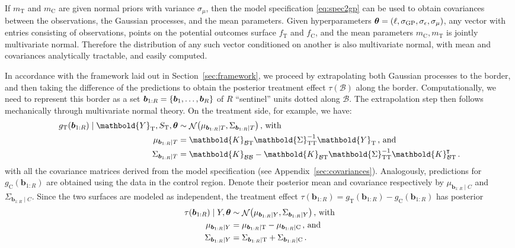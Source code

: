 \documentclass[letter,12pt]{article}
\DeclarePairedDelimiter{\parenthesis}{\lparen}{\rparen}
\DeclarePairedDelimiter{\curlybracket}{\lbrace}{\rbrace}
\newcommand{\del}[1]{\parenthesis*{#1}}
\newcommand{\cbr}[1]{\curlybracket*{#1}}
\DeclareMathOperator{\normal}{\mathcal{N}}
\newcommand*{\trans}{^{\mkern-1.5mu\intercal}}
\newcommand{\treat}{\mathrm{T}}
\newcommand{\ctrol}{\mathrm{C}}
\newcommand{\sigmaf}{\sigma_{\mathrm{GP}}}
\newcommand{\sigman}{\sigma_{\epsilon}}
\newcommand{\sigmamu}{\sigma_{\mu}}
\newcommand{\Yvec}{\mathbold{Y}}
\newcommand{\yt}{\Yvec_{\treat}}
\newcommand{\border}{\mathcal{B}}
\newcommand{\sentinel}{\bm{b}}
\newcommand{\numsent}{R}
\newcommand{\sentinels}{\sentinel_{1:\numsent}}
\newcommand{\sentinelset}{\cbr{\sentinel_1,\ldots,\sentinel_\numsent}}
\newcommand{\eqlabel}[1]{\label{#1}}
\newcommand{\hyperparam}{\bm{\theta}}
\newcommand{\Kmat}{\mathbold{K}}
\newcommand{\SigmaMat}{\mathbold{\Sigma}}
\newcommand{\KBB}{\Kmat_{\border \border}}
\newcommand{\KBT}{\Kmat_{\border \treat}}
\newcommand{\STT}{\SigmaMat_{\treat \treat}}
\begin{document}
If \(m_\treat\) and \(m_\ctrol\) are given normal priors with variance \(\sigmamu\), then the model specification \eqref{eq:spec2gp} can be used to obtain covariances between the observations, the Gaussian processes, and the mean parameters.
Given hyperparameters \(\hyperparam = \del{\ell,\sigmaf, \sigman, \sigmamu}\), any vector with entries consisting of observations, points on the potential outcomes surface \(f_{\treat}\) and \(f_{\ctrol}\), and the mean parameters \(m_{\ctrol}, m_{\treat}\) is jointly multivariate normal. Therefore the distribution of any such vector conditioned on another is also multivariate normal, with mean and covariances analytically tractable, and easily computed.



In accordance with the framework laid out in Section~\ref{sec:framework}, we proceed by extrapolating both Gaussian processes to the border,
and then taking the difference of the predictions to obtain the posterior treatment effect \(\tau(\border)\) along the border.
Computationally, we need to represent this border as a set \(\sentinels=\sentinelset\) of \(\numsent\) ``sentinel'' units dotted along \(\border\).
The extrapolation step then follows mechanically through multivariate normal theory.
On the treatment side, for example, we have:
\begin{equation}\begin{split}
    g_\treat{}(\sentinels) \mid \yt{}, S_\treat{}, \hyperparam &\sim \normal\del{\mu_{\sentinels \mid T}, \Sigma_{\sentinels \mid T}} \,\text{, with} \\
    \mu_{\sentinels \mid T} &=
    \KBT
    \STT^{-1} 
    \yt{} 
    \,\text{, and} \\
    \Sigma_{\sentinels \mid T} &=
    \KBB - \KBT \STT^{-1} \KBT\trans \,.
\end{split}
\label{eq:postvar2gp_t_or_c}
\end{equation}
with all the covariance matrices derived from the model specification (see Appendix~\ref{sec:covariances}).
Analogously, predictions for \(g_\ctrol{}(\sentinels)\) are obtained using the data in the control region.
Denote their posterior mean and covariance respectively by \(\mu_{\sentinels \mid C}\) and \(\Sigma_{\sentinels \mid C}\).
Since the two surfaces are modeled as independent, the treatment effect \(\tau(\sentinels)=g_\treat{}(\sentinels)-g_\ctrol{}(\sentinels)\) has posterior
\begin{equation}
    \begin{split}
        \tau(\sentinels) \mid Y, \hyperparam &\sim \normal\del{\mu_{\sentinels \mid Y}, \Sigma_{\sentinels \mid Y}} \,\text{, with}\\
        \mu_{\sentinels \mid Y} &= \mu_{\sentinels \mid \treat} - \mu_{\sentinels \mid \ctrol} \,\text{, and} \\
        \Sigma_{\sentinels \mid Y} &= \Sigma_{\sentinels \mid \treat} + \Sigma_{\sentinels \mid \ctrol} \,.
    \end{split}
    \eqlabel{eq:postvar2gp}
\end{equation}
\end{document}
